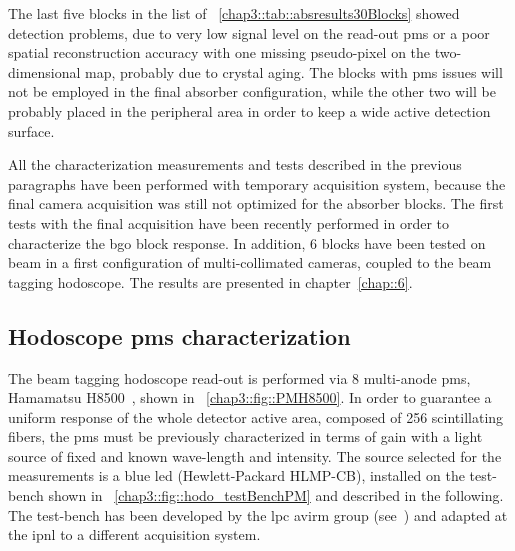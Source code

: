 The last five blocks in the list of \tablename~\ref{chap3::tab::absresults30Blocks} showed detection problems, due to very low signal level on the read-out \glspl{pm} or a poor spatial reconstruction accuracy with one missing pseudo-pixel on the two-dimensional map, probably due to crystal aging. The blocks with \glspl{pm} issues will not be employed in the final absorber configuration, while the other two will be probably placed in the peripheral area in order to keep a wide active detection surface.  

All the characterization measurements and tests described in the previous paragraphs have been performed with temporary acquisition system, because the final camera acquisition was still not optimized for the absorber blocks. The first tests with the final acquisition have been recently performed in order to characterize the \gls{bgo} block response. In addition, 6 blocks have been tested on beam in a first configuration of multi-collimated cameras, coupled to the beam tagging hodoscope. The results are presented in chapter~\ref{chap::6}.

\subsection{Hodoscope \glspl{pm} characterization}\label{chap3::subsec::hodoPMchar}         

The beam tagging hodoscope read-out is performed via 8 multi-anode \glspl{pm}, Hamamatsu H8500~\parencite{Hamamatsu2006}, shown in \figurename~\ref{chap3::fig::PMH8500}. In order to guarantee a uniform response of the whole detector active area, composed of 256 scintillating fibers, the \glspl{pm} must be previously characterized in terms of gain with a light source of fixed and known wave-length and intensity. The source selected for the measurements is a blue \gls{led} (Hewlett-Packard HLMP-CB), installed on the test-bench shown in \figurename~\ref{chap3::fig::hodo_testBenchPM} and described in the following. The test-bench has been developed by the \gls{lpc} \gls{avirm} group (see~\cite{Gaglione2013}) and adapted at the \gls{ipnl} to a different acquisition system.

